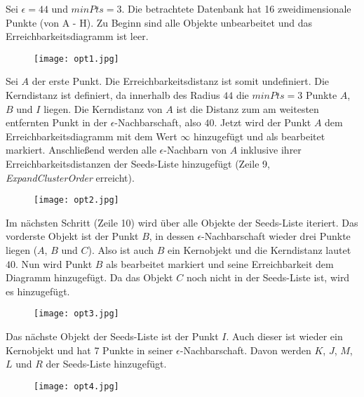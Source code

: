 \documentclass[11pt,ceqn]{book}
\begin{document}
Sei $\epsilon = 44$ und $minPts = 3$. Die betrachtete Datenbank hat 16 zweidimensionale Punkte (von A - H). Zu Beginn sind alle Objekte unbearbeitet und das Erreichbarkeitsdiagramm ist leer. 
\begin{figure}[H]
\centering
\texttt{[image: opt1.jpg]}
\end{figure}
Sei $A$ der erste Punkt. Die Erreichbarkeitsdistanz ist somit undefiniert. Die Kerndistanz ist definiert, da innerhalb des Radius $44$ die $minPts = 3$ Punkte $A$, $B$ und $I$ liegen. Die Kerndistanz von $A$ ist die Distanz zum am weitesten entfernten Punkt in der $\epsilon$-Nachbarschaft, also $40$. Jetzt wird der Punkt $A$ dem Erreichbarkeitsdiagramm mit dem Wert $\infty$ hinzugefügt und als bearbeitet markiert. Anschließend werden alle $\epsilon$-Nachbarn von $A$ inklusive ihrer Erreichbarkeitsdistanzen der Seeds-Liste hinzugefügt (Zeile 9, \textit{ExpandClusterOrder} erreicht).
\begin{figure}[H]
\centering
\texttt{[image: opt2.jpg]}
\end{figure}
Im nächsten Schritt (Zeile 10) wird über alle Objekte der Seeds-Liste iteriert. Das vorderste Objekt ist der Punkt $B$, in dessen $\epsilon$-Nachbarschaft wieder drei Punkte liegen ($A$, $B$ und $C$). Also ist auch $B$ ein Kernobjekt und die Kerndistanz lautet $40$. Nun wird Punkt $B$ als bearbeitet markiert und seine Erreichbarkeit dem Diagramm hinzugefügt. Da das Objekt $C$ noch nicht in der Seeds-Liste ist, wird es hinzugefügt.
\begin{figure}[H]
\centering
\texttt{[image: opt3.jpg]}
\end{figure}
Das nächste Objekt der Seeds-Liste ist der Punkt $I$. Auch dieser ist wieder ein Kernobjekt und hat 7 Punkte in seiner $\epsilon$-Nachbarschaft. Davon werden $K$, $J$, $M$, $L$ und $R$ der Seeds-Liste hinzugefügt.
\begin{figure}[H]
\centering
\texttt{[image: opt4.jpg]}
\end{figure}
\end{document}
